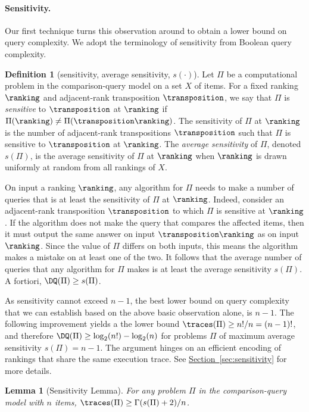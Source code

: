 \documentclass[11pt]{article}
\numberwithin{equation}{section}
\newtheorem{lemma}[theorem]{Lemma}
\theoremstyle{definition}
\newtheorem{definition}[theorem]{Definition}
\theoremstyle{plain}
\newcommand{\expref}[2]{\hyperref[#2]{#1~\ref{#2}}}
\begin{document}
\paragraph{Sensitivity.}
Our first technique turns this observation around to obtain a lower bound on query complexity. We adopt the terminology of sensitivity from Boolean query complexity. 

\begin{definition}[sensitivity, average sensitivity, $s(\cdot)$]\label{def:sensitivity}
Let $\Pi$ be a computational problem in the comparison-query model on a set $X$ of items. For a fixed ranking $\ranking$ and adjacent-rank transposition $\transposition$, we say that $\Pi$ is \emph{sensitive} to $\transposition$ at $\ranking$ if $\Pi(\ranking) \ne \Pi(\transposition \ranking)$. The sensitivity of $\Pi$ at $\ranking$ is the number of adjacent-rank transpositions $\transposition$ such that $\Pi$ is sensitive to $\transposition$ at $\ranking$. The \emph{average sensitivity} of $\Pi$, denoted $s(\Pi)$, is the average sensitivity of $\Pi$ at $\ranking$ when $\ranking$ is drawn uniformly at random from all rankings of $X$.
\end{definition}
On input a ranking $\ranking$, any algorithm for $\Pi$ needs to make a number of queries that is at least the sensitivity of $\Pi$ at $\ranking$. Indeed, consider an adjacent-rank transposition $\transposition$ to which $\Pi$ is sensitive at $\ranking$. If the algorithm does not make the query that compares the affected items, then it must output the same answer on input $\transposition \ranking$ as on input $\ranking$. Since the value of $\Pi$ differs on both inputs, this means the algorithm makes a mistake on at least one of the two. It follows that the average number of queries that any algorithm for $\Pi$ makes is at least the average sensitivity $s(\Pi)$. A fortiori, $\DQ(\Pi) \ge s(\Pi)$. 

As sensitivity cannot exceed $n-1$, the best lower bound on query complexity that we can establish based on the above basic observation alone, is $n-1$. The following improvement yields a the lower bound $\traces(\Pi) \ge n!/n = (n-1)!$, and therefore $\DQ(\Pi) \ge \log_2(n!) - \log_2(n)$ for problems $\Pi$ of maximum average sensitivity $s(\Pi)=n-1$. The argument hinges on an efficient encoding of rankings that share the same execution trace. See \expref{Section}{sec:sensitivity} for more details.

\begin{lemma}[Sensitivity Lemma]\label{lemma:sensitivity}
For any problem $\Pi$ in the comparison-query model with $n$ items, $\traces(\Pi) \ge \Gamma(s(\Pi)+2)/n$. 
\end{lemma}
\end{document}
